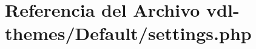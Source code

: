 \hypertarget{settings_8php}{\section{Referencia del Archivo vdl-\/themes/\-Default/settings.php}
\label{settings_8php}
}
